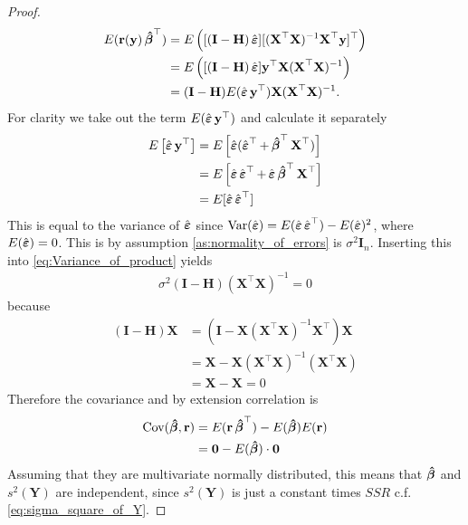 \begin{proof}
\begin{align} \label{eq:Variance_of_product}
    E(\textbf{r}(\textbf{y}) \operatorname{\boldsymbol{\hat{\beta}}}^\top) &= E \left( [(\textbf{I} - \textbf{H}) \operatorname{\hat{\boldsymbol{\varepsilon}}}] [(\textbf{X}^\top \textbf{X})^{-1} \textbf{X}^\top \textbf{y}]^\top \right) \\
    &= E \left( [(\textbf{I}-\textbf{H}) \operatorname{\hat{\boldsymbol{\varepsilon}}}] \textbf{y}^\top \textbf{X} (\textbf{X}^\top \textbf{X})^{-1} \right) \nonumber \\
    &= (\textbf{I}-\textbf{H}) E(\operatorname{\hat{\boldsymbol{\varepsilon}}} \textbf{y}^\top ) \textbf{X}(\textbf{X}^\top \textbf{X})^{-1}. \nonumber
\end{align}
For clarity we take out the term $E(\operatorname{\hat{\boldsymbol{\varepsilon}}} \textbf{y}^\top )$ and calculate it separately
\begin{align*}
    E \left[ \operatorname{\hat{\boldsymbol{\varepsilon}}} \textbf{y}^\top \right] &= E \left[ \operatorname{\hat{\boldsymbol{\varepsilon}}} (\operatorname{\hat{\boldsymbol{\varepsilon}}}^\top + \operatorname{\boldsymbol{\hat{\beta}}}^\top \textbf{X}^\top) \right] \\
    &= E \left[ \operatorname{\hat{\boldsymbol{\varepsilon}}} \operatorname{\hat{\boldsymbol{\varepsilon}}}^\top + \operatorname{\hat{\boldsymbol{\varepsilon}}} \operatorname{\boldsymbol{\hat{\beta}}}^\top \textbf{X}^\top \right] \\
    &= E[\operatorname{\hat{\boldsymbol{\varepsilon}}} \operatorname{\hat{\boldsymbol{\varepsilon}}}^\top]
\end{align*}
This is equal to the variance of $\operatorname{\hat{\boldsymbol{\varepsilon}}}$ since $\operatorname{\text{Var}}(\operatorname{\hat{\boldsymbol{\varepsilon}}}) = E(\operatorname{\hat{\boldsymbol{\varepsilon}}} \operatorname{\hat{\boldsymbol{\varepsilon}}}^\top) - E(\operatorname{\hat{\boldsymbol{\varepsilon}}})^2$, where $E(\operatorname{\hat{\boldsymbol{\varepsilon}}})=0$.
This is by assumption \ref{as:normality_of_errors} is $\sigma^2 \textbf{I}_n$.
Inserting this into \eqref{eq:Variance_of_product} yields
\begin{align*}
    \sigma^2 (\textbf{I}-\textbf{H})  (\textbf{X}^\top \textbf{X})^{-1} = 0
\end{align*}
because
\begin{align*}
    (\textbf{I}-\textbf{H})\textbf{X} &= (\textbf{I}-\textbf{X}(\textbf{X}^\top \textbf{X})^{-1}\textbf{X}^\top)\textbf{X} \\
    &= \textbf{X} - \textbf{X} (\textbf{X}^\top \textbf{X})^{-1} (\textbf{X}^\top \textbf{X}) \\
    &= \textbf{X} - \textbf{X} = 0
\end{align*}
Therefore the covariance and by extension correlation is
\begin{align*}
    \operatorname{\text{Cov}} (\operatorname{\boldsymbol{\hat{\beta}}}, \textbf{r}) &= E(\textbf{r} \operatorname{\boldsymbol{\hat{\beta}}}^\top) - E(\operatorname{\boldsymbol{\hat{\beta}}}) E(\textbf{r}) \\
    &= \textbf{0} - E(\operatorname{\boldsymbol{\hat{\beta}}}) \cdot \textbf{0}
\end{align*}
Assuming that they are multivariate normally distributed, this means that $\operatorname{\boldsymbol{\hat{\beta}}}$ and $s^2(\textbf{Y})$ are independent, since $s^2(\textbf{Y})$ is just a constant times $SSR$ c.f.$\!$ \eqref{eq:sigma_square_of_Y}.


\end{proof}

